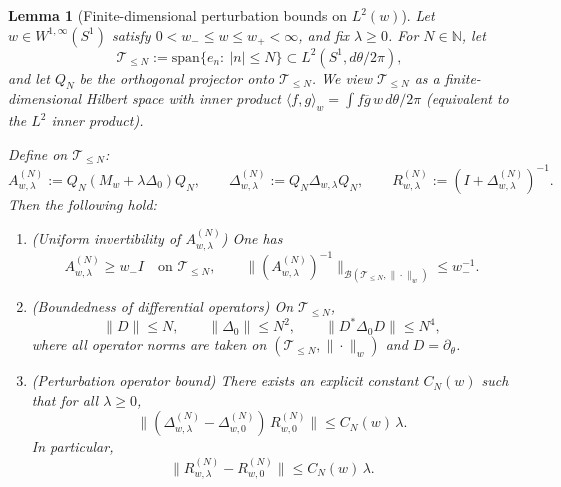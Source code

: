 \documentclass{amsart}
\numberwithin{equation}{section}
\newtheorem{lemma}[theorem]{Lemma}
\theoremstyle{definition}
\theoremstyle{remark}
\begin{document}
\begin{lemma}[Finite-dimensional perturbation bounds on $L^2(w)$]
\label{lem:finite-perturbation-L2w}
Let $w\in W^{1,\infty}(S^1)$ satisfy $0<w_-\le w\le w_+<\infty$, and fix $\lambda\ge 0$.
For $N\in\mathbb N$, let
\[
\mathcal T_{\le N}:=\mathrm{span}\{e_n:\ |n|\le N\}\subset L^2(S^1,d\theta/2\pi),
\]
and let $Q_N$ be the orthogonal projector onto $\mathcal T_{\le N}$.
We view $\mathcal T_{\le N}$ as a finite-dimensional Hilbert space with inner product
$\langle f,g\rangle_w=\int f\overline g\,w\,d\theta/2\pi$ (equivalent to the $L^2$ inner product).

Define on $\mathcal T_{\le N}$:
\[
A_{w,\lambda}^{(N)} := Q_N(M_w+\lambda\Delta_0)Q_N,
\qquad
\Delta_{w,\lambda}^{(N)}:= Q_N\Delta_{w,\lambda}Q_N,
\qquad
R_{w,\lambda}^{(N)}:=(I+\Delta_{w,\lambda}^{(N)})^{-1}.
\]
Then the following hold:

\begin{enumerate}
\item (\emph{Uniform invertibility of $A_{w,\lambda}^{(N)}$}) One has
\[
A_{w,\lambda}^{(N)}\ge w_- I \quad\text{on }\mathcal T_{\le N},
\qquad
\|(A_{w,\lambda}^{(N)})^{-1}\|_{\mathcal B(\mathcal T_{\le N},\|\cdot\|_w)}
\le w_-^{-1}.
\]

\item (\emph{Boundedness of differential operators}) On $\mathcal T_{\le N}$,
\[
\|D\| \le N,\qquad \|\Delta_0\|\le N^2,\qquad \|D^*\Delta_0D\|\le N^4,
\]
where all operator norms are taken on $(\mathcal T_{\le N},\|\cdot\|_w)$ and $D=\partial_\theta$.

\item (\emph{Perturbation operator bound}) There exists an explicit constant $C_N(w)$ such that
for all $\lambda\ge 0$,
\begin{equation}\label{eq:finite-perturb-bound}
\big\|(\Delta_{w,\lambda}^{(N)}-\Delta_{w,0}^{(N)})\,R_{w,0}^{(N)}\big\|
\le C_N(w)\,\lambda.
\end{equation}
In particular,
\begin{equation}\label{eq:finite-resolvent-bound}
\big\|R_{w,\lambda}^{(N)}-R_{w,0}^{(N)}\big\|
\le C_N(w)\,\lambda.
\end{equation}
\end{enumerate}
\end{lemma}
\end{document}
